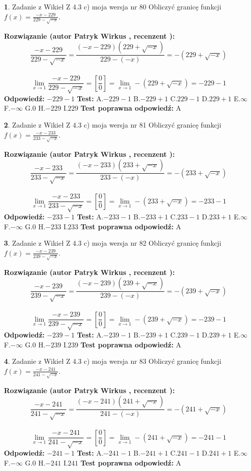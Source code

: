 \documentclass[12pt, a4paper]{article}
\theoremstyle{definition} %
\newtheorem{zad}{}
\newcommand{\zadStart}[1]{\begin{zad}#1\newline}
\newcommand{\zadStop}{\end{zad}}
\newcommand{\rozwStart}[2]{\noindent \textbf{Rozwiązanie (autor #1 , recenzent #2): }\newline}
\newcommand{\rozwStop}{\newline}
\newcommand{\odpStart}{\noindent \textbf{Odpowiedź:}\newline}
\newcommand{\odpStop}{\newline}
\newcommand{\testStart}{\noindent \textbf{Test:}\newline}
\newcommand{\testStop}{\newline}
\newcommand{\kluczStart}{\noindent \textbf{Test poprawna odpowiedź:}\newline}
\newcommand{\kluczStop}{\newline}
\begin{document}
\zadStart{Zadanie z Wikieł Z 4.3 c) moja wersja nr 80}
Obliczyć granicę funkcji $f(x)=\frac{-x-229}{229-\sqrt{-x}}$.
\zadStop
\rozwStart{Patryk Wirkus}{}
$$\frac{-x-229}{229-\sqrt{-x}}=\frac{(-x-229)(229+\sqrt{-x})}{229-(-x)}=-(229+\sqrt{-x})$$
\\
$$\lim\limits_{x\to1}\frac{-x-229}{229-\sqrt{-x}}=[\frac{0}{0}]=\lim\limits_{x\to1}-(229+\sqrt{-x}) =-229-1$$
\rozwStop
\odpStart
$-229-1$
\odpStop
\testStart
A.$-229-1$
B.$-229+1$
C.$229-1$
D.$229+1$
E.$\infty$
F.$-\infty$
G.$0$
H.$-229$
I.$229$
\testStop
\kluczStart
A
\kluczStop



\zadStart{Zadanie z Wikieł Z 4.3 c) moja wersja nr 81}
Obliczyć granicę funkcji $f(x)=\frac{-x-233}{233-\sqrt{-x}}$.
\zadStop
\rozwStart{Patryk Wirkus}{}
$$\frac{-x-233}{233-\sqrt{-x}}=\frac{(-x-233)(233+\sqrt{-x})}{233-(-x)}=-(233+\sqrt{-x})$$
\\
$$\lim\limits_{x\to1}\frac{-x-233}{233-\sqrt{-x}}=[\frac{0}{0}]=\lim\limits_{x\to1}-(233+\sqrt{-x}) =-233-1$$
\rozwStop
\odpStart
$-233-1$
\odpStop
\testStart
A.$-233-1$
B.$-233+1$
C.$233-1$
D.$233+1$
E.$\infty$
F.$-\infty$
G.$0$
H.$-233$
I.$233$
\testStop
\kluczStart
A
\kluczStop



\zadStart{Zadanie z Wikieł Z 4.3 c) moja wersja nr 82}
Obliczyć granicę funkcji $f(x)=\frac{-x-239}{239-\sqrt{-x}}$.
\zadStop
\rozwStart{Patryk Wirkus}{}
$$\frac{-x-239}{239-\sqrt{-x}}=\frac{(-x-239)(239+\sqrt{-x})}{239-(-x)}=-(239+\sqrt{-x})$$
\\
$$\lim\limits_{x\to1}\frac{-x-239}{239-\sqrt{-x}}=[\frac{0}{0}]=\lim\limits_{x\to1}-(239+\sqrt{-x}) =-239-1$$
\rozwStop
\odpStart
$-239-1$
\odpStop
\testStart
A.$-239-1$
B.$-239+1$
C.$239-1$
D.$239+1$
E.$\infty$
F.$-\infty$
G.$0$
H.$-239$
I.$239$
\testStop
\kluczStart
A
\kluczStop



\zadStart{Zadanie z Wikieł Z 4.3 c) moja wersja nr 83}
Obliczyć granicę funkcji $f(x)=\frac{-x-241}{241-\sqrt{-x}}$.
\zadStop
\rozwStart{Patryk Wirkus}{}
$$\frac{-x-241}{241-\sqrt{-x}}=\frac{(-x-241)(241+\sqrt{-x})}{241-(-x)}=-(241+\sqrt{-x})$$
\\
$$\lim\limits_{x\to1}\frac{-x-241}{241-\sqrt{-x}}=[\frac{0}{0}]=\lim\limits_{x\to1}-(241+\sqrt{-x}) =-241-1$$
\rozwStop
\odpStart
$-241-1$
\odpStop
\testStart
A.$-241-1$
B.$-241+1$
C.$241-1$
D.$241+1$
E.$\infty$
F.$-\infty$
G.$0$
H.$-241$
I.$241$
\testStop
\kluczStart
A
\kluczStop
\end{document}
